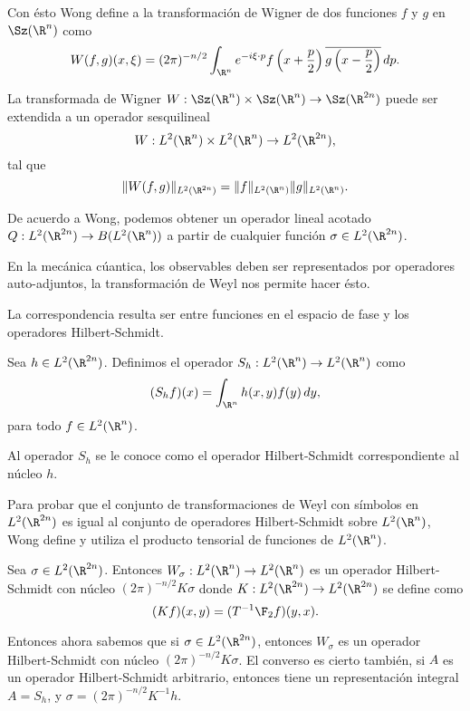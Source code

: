   Con ésto Wong define a la transformación de Wigner de dos
  funciones $f$ y $g$ en $\Sz(\R^{n})$ como
  \begin{equation}
    W(f,g)(x,\xi)
    = (2\pi)^{-n / 2} \int_{\R^{n}} e^{-i\xi \cdot p}
    f\left( x + \frac{p}{2} \right) \overline{g\left( x -
    \frac{p}{2} \right) } \, dp.
  \end{equation}

  La transformada de Wigner $W : \Sz(\R^{n}) \times
  \Sz(\R^{n}) \to \Sz(\R^{2n})$ puede ser extendida a un
  operador sesquilineal
  \[
    W : L^2(\R^{n}) \times L^2(\R^{n}) \to L^2(\R^{2n}),
  \] 
  tal que
  \[
    \|W(f,g)\|_{L^2(\R^{2n})}
    = \|f\|_{L^2(\R^{n})} \|g\|_{L^2(\R^{n})}.
  \] 

  De acuerdo a Wong, podemos obtener un operador lineal
  acotado $Q : L^2(\R^{2n}) \to B(L^2(\R^{n}))$ a partir de
  cualquier función $\sigma \in L^2(\R^{2n})$.

  En la mecánica cúantica, los observables deben ser
  representados por operadores auto-adjuntos, la
  transformación de Weyl nos permite hacer ésto.

  La correspondencia resulta ser entre funciones en el
  espacio de fase y los operadores Hilbert-Schmidt.

  \begin{definition}
    Sea $h \in L^2(\R^{2n})$. Definimos el operador $S_h :
    L^2(\R^{n}) \to L^2(\R^{n})$ como
    \begin{equation}
      (S_hf)(x)
      = \int_{\R^{n}} h(x,y) f(y) \, dy,
    \end{equation}
    para todo $f \in L^2(\R^{n})$.
  \end{definition}
  Al operador $S_h$ se le conoce como el operador
  Hilbert-Schmidt correspondiente al núcleo $h$.

  Para probar que el conjunto de transformaciones de Weyl
  con símbolos en $L^2(\R^{2n})$ es igual al conjunto de
  operadores Hilbert-Schmidt sobre $L^2(\R^{n})$, Wong
  define y utiliza el producto tensorial de funciones de
  $L^2(\R^{n})$.

  \begin{theorem}
    Sea $\sigma \in L^2(\R^{2n})$. Entonces $W_\sigma :
    L^2(\R^{n}) \to L^2(\R^{n})$ es un operador
    Hilbert-Schmidt con núcleo $(2\pi)^{-n / 2}K \sigma$
    donde $K : L^2(\R^{2n}) \to L^2(\R^{2n})$ se define como
    \[
      (Kf)(x,y)
      = (T^{-1}\F_2 f)(y,x).
    \] 
  \end{theorem}

  Entonces ahora sabemos que si $\sigma \in L^2(\R^{2n})$,
  entonces $W_\sigma$ es un operador Hilbert-Schmidt con
  núcleo $(2\pi)^{-n / 2} K \sigma$. El converso es cierto
  también, si $A$ es un operador Hilbert-Schmidt arbitrario,
  entonces tiene un representación integral $A = S_h$, y
  $\sigma = (2\pi)^{-n / 2} K^{-1}h$.

